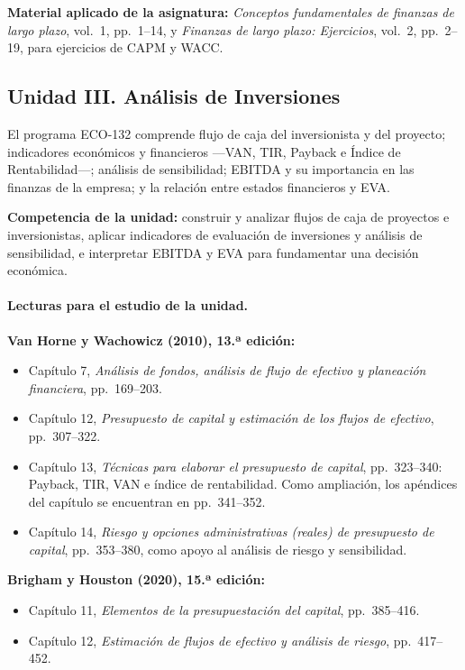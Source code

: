 \documentclass[10pt]{article}
\begin{document}
\textbf{Material aplicado de la asignatura:}
\textit{Conceptos fundamentales de finanzas de largo plazo}, vol.~1,
pp.~1--14, y \textit{Finanzas de largo plazo: Ejercicios}, vol.~2,
pp.~2--19, para ejercicios de CAPM y WACC.
\parencite{vanhorne2010fundamentos,brigham2020fundamentos,armoa2026conceptos,armoa2026ejercicios}

\subsection{Unidad III. Análisis de Inversiones}

El programa ECO-132 comprende flujo de caja del inversionista y del proyecto;
indicadores económicos y financieros ---VAN, TIR, Payback e Índice de
Rentabilidad---; análisis de sensibilidad; EBITDA y su importancia en las
finanzas de la empresa; y la relación entre estados financieros y EVA.
\parencite{uaProgramaFinanzasLargoPlazo}

\textbf{Competencia de la unidad:} construir y analizar flujos de caja de
proyectos e inversionistas, aplicar indicadores de evaluación de inversiones y
análisis de sensibilidad, e interpretar EBITDA y EVA para fundamentar una
decisión económica.

\paragraph{Lecturas para el estudio de la unidad.}

\textbf{Van Horne y Wachowicz (2010), 13.ª edición:}
\begin{itemize}
    \item Capítulo 7, \textit{Análisis de fondos, análisis de flujo de efectivo
y planeación financiera}, pp.~169--203.
    \item Capítulo 12, \textit{Presupuesto de capital y estimación de los
flujos de efectivo}, pp.~307--322.
    \item Capítulo 13, \textit{Técnicas para elaborar el presupuesto de
    capital}, pp.~323--340: Payback, TIR, VAN e índice de rentabilidad. Como
    ampliación, los apéndices del capítulo se encuentran en pp.~341--352.
    \item Capítulo 14, \textit{Riesgo y opciones administrativas (reales) de
    presupuesto de capital}, pp.~353--380, como apoyo al análisis de riesgo y
    sensibilidad.
\end{itemize}

\textbf{Brigham y Houston (2020), 15.ª edición:}
\begin{itemize}
    \item Capítulo 11, \textit{Elementos de la presupuestación del capital},
    pp.~385--416.
    \item Capítulo 12, \textit{Estimación de flujos de efectivo y análisis de
riesgo}, pp.~417--452.
\end{itemize}
\end{document}
